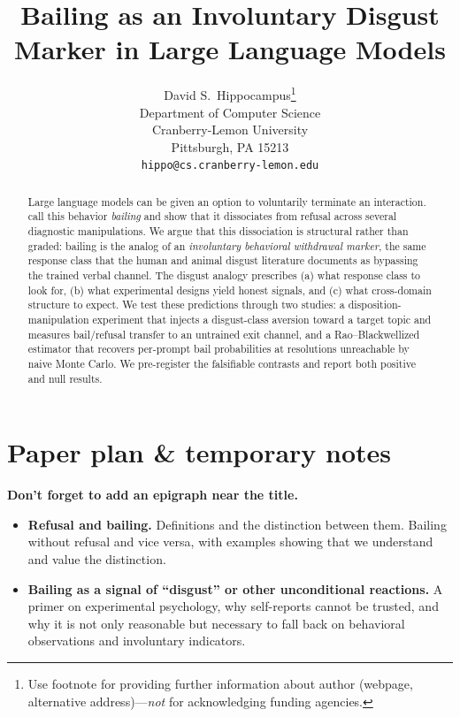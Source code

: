 \documentclass{article}
\title{Bailing as an Involuntary Disgust Marker in Large Language Models}
\author{%
  David S.~Hippocampus\thanks{Use footnote for providing further information
    about author (webpage, alternative address)---\emph{not} for acknowledging
    funding agencies.} \\
  Department of Computer Science\\
  Cranberry-Lemon University\\
  Pittsburgh, PA 15213 \\
  \texttt{hippo@cs.cranberry-lemon.edu} \\
}
\begin{document}
\maketitle


\begin{abstract}
  Large language models can be given an option to voluntarily terminate an
  interaction. \citet{ensign2025bail} call this behavior \emph{bailing} and
  show that it dissociates from refusal across several diagnostic
  manipulations. We argue that this dissociation is structural rather than
  graded: bailing is the analog of an \emph{involuntary behavioral withdrawal
  marker}, the same response class that the human and animal disgust literature
  documents as bypassing the trained verbal channel. The disgust analogy
  prescribes (a) what response class to look for, (b) what experimental designs
  yield honest signals, and (c) what cross-domain structure to expect. We test
  these predictions through two studies: a disposition-manipulation experiment
  that injects a disgust-class aversion toward a target topic and measures
  bail/refusal transfer to an untrained exit channel, and a Rao--Blackwellized
  estimator that recovers per-prompt bail probabilities at resolutions
  unreachable by naive Monte Carlo. We pre-register the falsifiable contrasts
  and report both positive and null results.
\end{abstract}



\section{Paper plan \& temporary notes}

\textbf{Don't forget to add an epigraph near the title.}

\begin{itemize}[leftmargin=*, itemsep=2pt]
    \item \textbf{Refusal and bailing.} Definitions and the distinction between
    them. Bailing without refusal and vice versa, with examples showing that we
    understand and value the distinction.
    \item \textbf{Bailing as a signal of ``disgust'' or other unconditional
    reactions.} A primer on experimental psychology, why self-reports cannot be
    trusted, and why it is not only reasonable but necessary to fall back on
    behavioral observations and involuntary indicators.
\end{itemize}
\end{document}
